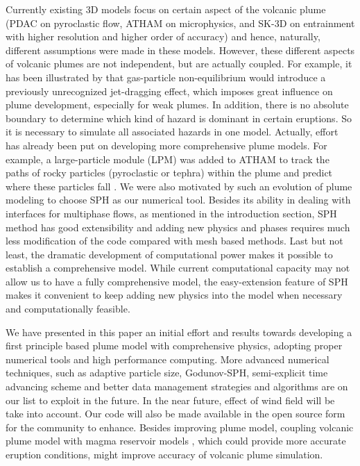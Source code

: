\documentclass[gmd, manuscript]{copernicus}
\begin{document}
Currently existing 3D models focus on certain aspect of the volcanic plume (PDAC on pyroclastic flow, ATHAM on microphysics, and SK-3D on entrainment with higher resolution and higher order of accuracy) and hence, naturally, different assumptions were made in these models. However, these different aspects of volcanic plumes are not independent, but are actually coupled. For example, it has been illustrated by \cite{cerminara2016large} that gas-particle non-equilibrium would introduce a previously unrecognized jet-dragging effect, which imposes great influence on plume development, especially for weak plumes. In addition, there is no absolute boundary to determine which kind of hazard is dominant in certain eruptions. So it is necessary to simulate all associated hazards in one model. Actually, effort has already been put on developing more comprehensive plume models. For example, a large-particle module (LPM) was added to ATHAM to track the paths of rocky particles (pyroclastic or tephra) within the plume and predict where these particles fall \citep{kobs2009modeling}. We were also motivated by such an evolution of plume modeling to choose SPH as our numerical tool. Besides its ability in dealing with interfaces for multiphase flows, as mentioned in the introduction section, SPH method has good extensibility and adding new physics and phases requires much less modification of the code compared with mesh based methods. Last but not least, the dramatic development of computational power makes it possible to establish a comprehensive model. While current computational capacity may not allow us to have a fully comprehensive model, the easy-extension feature of SPH makes it convenient to keep adding new physics into the model when necessary and computationally feasible. 

We have presented in this paper an initial effort and results towards developing a first principle based plume model with comprehensive physics, adopting proper numerical tools and high performance computing. More advanced numerical techniques, such as adaptive particle size, Godunov-SPH, semi-explicit time advancing scheme and better data management strategies and algorithms are on our list to exploit in the future. In the near future, effect of wind field will be take into account. Our code will also be made available in the open source form for the community to enhance. Besides improving plume model, coupling volcanic plume model with magma reservoir models \citep[e.g.][]{terray2018new}, which could provide more accurate eruption conditions, might improve accuracy of volcanic plume simulation. 
\end{document}
